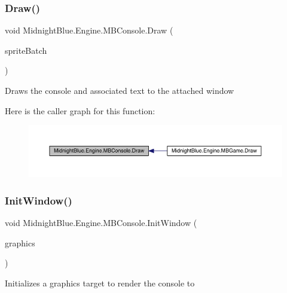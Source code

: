 \subsubsection{\texorpdfstring{Draw()}{Draw()}}
{\footnotesize\ttfamily void Midnight\+Blue.\+Engine.\+M\+B\+Console.\+Draw (\begin{DoxyParamCaption}\item[{Sprite\+Batch}]{sprite\+Batch }\end{DoxyParamCaption})\hspace{0.3cm}{\ttfamily [inline]}}



Draws the console and associated text to the attached window 

Here is the caller graph for this function\+:
\nopagebreak
\begin{figure}[H]
\begin{center}
\leavevmode
\includegraphics[width=350pt]{class_midnight_blue_1_1_engine_1_1_m_b_console_a807e956ca8a90cbcefb785e062d72b2d_icgraph}
\end{center}
\end{figure}
\hypertarget{class_midnight_blue_1_1_engine_1_1_m_b_console_a08a6230b8a61577552243f30fa3b07a2}{}\label{class_midnight_blue_1_1_engine_1_1_m_b_console_a08a6230b8a61577552243f30fa3b07a2} 
\subsubsection{\texorpdfstring{Init\+Window()}{InitWindow()}}
{\footnotesize\ttfamily void Midnight\+Blue.\+Engine.\+M\+B\+Console.\+Init\+Window (\begin{DoxyParamCaption}\item[{Graphics\+Device}]{graphics }\end{DoxyParamCaption})\hspace{0.3cm}{\ttfamily [inline]}}



Initializes a graphics target to render the console to 



